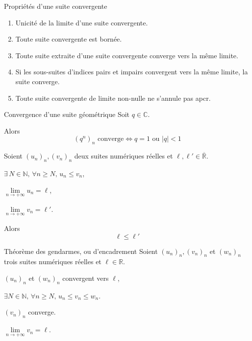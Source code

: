     \begin{prop}{Propriétés d’une suite convergente}{}
        \begin{enumerate}
            \item Unicité de la limite d’une suite convergente.
            \item Toute suite convergente est bornée.
            \item Toute suite extraite d’une suite convergente converge vers la même limite.
            \item Si les sous-suites d’indices pairs et impairs convergent vers la même limite, la suite converge.
            \item Toute suite convergente de limite non-nulle ne s’annule pas apcr.
        \end{enumerate}
    \end{prop}

    \begin{theo}{Convergence d’une suite géométrique}{}
        Soit $q \in \mathbb{C}$.

        Alors \[ (q^n)_n \text{ converge} \iff q = 1 \text{ ou } |q| < 1 \]
    \end{theo}

    \begin{prop}{}{}
        Soient $(u_n)_n, (v_n)_n$ deux suites numériques réelles et $\ell, \ell' \in \overline{\mathbb{R}}$.

        \begin{suppose}
            \item $\exists \, N \in \mathbb{N}, \, \forall n \geq N, \, u_n \leq v_n$,
            \item $\lim\limits_{n \rightarrow +\infty} u_n = \ell$,
            \item $\lim\limits_{n \rightarrow +\infty} v_n = \ell'$.
        \end{suppose}
        Alors \[ \ell \leq \ell' \]
    \end{prop}

    \begin{theo}{Théorème des gendarmes, ou d’encadrement}{}
        Soient $(u_n)_n,(v_n)_n$ et $(w_n)_n$ trois suites numériques réelles et $\ell \in \mathbb{R}$.

        \begin{suppose}
            \item $(u_n)_n$ et $(w_n)_n$ convergent vers $\ell$,
            \item $\exists N \in \mathbb{N}, \, \forall n \geq N, \, u_n \leq v_n \leq w_n$.
        \end{suppose}
        \begin{alors}
            \item $ (v_n)_n $ converge.
            \item $ \lim\limits_{n \rightarrow +\infty} v_n = \ell $.
        \end{alors}
    \end{theo}

